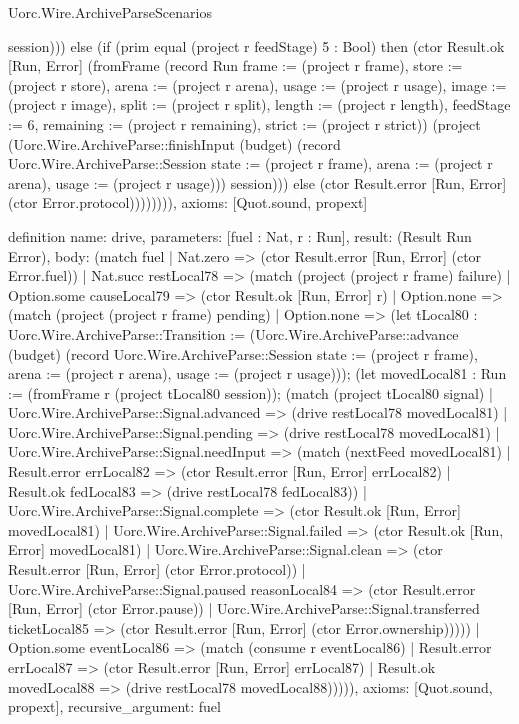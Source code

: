 \begin{lexlean}{Uorc.Wire.ArchiveParseScenarios}
\begin{semanticmodule}
{session))) else (if (prim equal (project r feedStage) 5 : Bool) then (ctor Result.ok [Run, Error] (fromFrame (record Run {frame := (project r frame), store := (project r store), arena := (project r arena), usage := (project r usage), image := (project r image), split := (project r split), length := (project r length), feedStage := 6, remaining := (project r remaining), strict := (project r strict)}) (project (Uorc.Wire.ArchiveParse::finishInput (budget) (record Uorc.Wire.ArchiveParse::Session {state := (project r frame), arena := (project r arena), usage := (project r usage)})) session))) else (ctor Result.error [Run, Error] (ctor Error.protocol)))))))),
  axioms: [Quot.sound, propext]
}

definition{
  name: drive,
  parameters: [fuel : Nat, r : Run],
  result: (Result Run Error),
  body: (match fuel
    | Nat.zero => (ctor Result.error [Run, Error] (ctor Error.fuel))
    | Nat.succ restLocal78 => (match (project (project r frame) failure)
      | Option.some causeLocal79 => (ctor Result.ok [Run, Error] r)
      | Option.none => (match (project (project r frame) pending)
        | Option.none => (let tLocal80 : Uorc.Wire.ArchiveParse::Transition := (Uorc.Wire.ArchiveParse::advance (budget) (record Uorc.Wire.ArchiveParse::Session {state := (project r frame), arena := (project r arena), usage := (project r usage)})); (let movedLocal81 : Run := (fromFrame r (project tLocal80 session)); (match (project tLocal80 signal)
          | Uorc.Wire.ArchiveParse::Signal.advanced => (drive restLocal78 movedLocal81)
          | Uorc.Wire.ArchiveParse::Signal.pending => (drive restLocal78 movedLocal81)
          | Uorc.Wire.ArchiveParse::Signal.needInput => (match (nextFeed movedLocal81)
            | Result.error errLocal82 => (ctor Result.error [Run, Error] errLocal82)
            | Result.ok fedLocal83 => (drive restLocal78 fedLocal83))
          | Uorc.Wire.ArchiveParse::Signal.complete => (ctor Result.ok [Run, Error] movedLocal81)
          | Uorc.Wire.ArchiveParse::Signal.failed => (ctor Result.ok [Run, Error] movedLocal81)
          | Uorc.Wire.ArchiveParse::Signal.clean => (ctor Result.error [Run, Error] (ctor Error.protocol))
          | Uorc.Wire.ArchiveParse::Signal.paused reasonLocal84 => (ctor Result.error [Run, Error] (ctor Error.pause))
          | Uorc.Wire.ArchiveParse::Signal.transferred ticketLocal85 => (ctor Result.error [Run, Error] (ctor Error.ownership)))))
        | Option.some eventLocal86 => (match (consume r eventLocal86)
          | Result.error errLocal87 => (ctor Result.error [Run, Error] errLocal87)
          | Result.ok movedLocal88 => (drive restLocal78 movedLocal88))))),
  axioms: [Quot.sound, propext],
  recursive_argument: fuel
}


\end{semanticmodule}
\end{lexlean}
